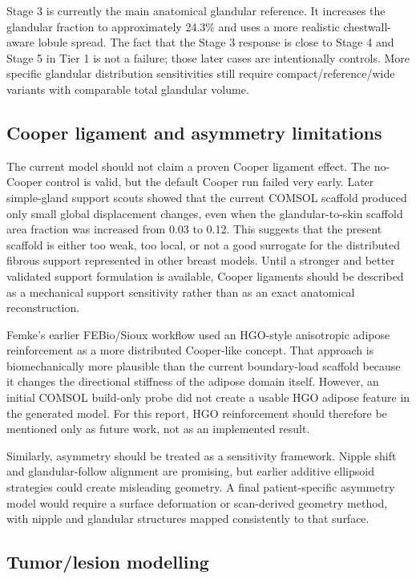 Stage 3 is currently the main anatomical glandular reference. It increases the glandular fraction to approximately 24.3\% and uses a more realistic chestwall-aware lobule spread. The fact that the Stage 3 response is close to Stage 4 and Stage 5 in Tier 1 is not a failure; those later cases are intentionally controls. More specific glandular distribution sensitivities still require compact/reference/wide variants with comparable total glandular volume.

\subsection{Cooper ligament and asymmetry limitations}

The current model should not claim a proven Cooper ligament effect. The no-Cooper control is valid, but the default Cooper run failed very early. Later simple-gland support scouts showed that the current COMSOL scaffold produced only small global displacement changes, even when the glandular-to-skin scaffold area fraction was increased from 0.03 to 0.12. This suggests that the present scaffold is either too weak, too local, or not a good surrogate for the distributed fibrous support represented in other breast models. Until a stronger and better validated support formulation is available, Cooper ligaments should be described as a mechanical support sensitivity rather than as an exact anatomical reconstruction.

Femke's earlier FEBio/Sioux workflow used an HGO-style anisotropic adipose reinforcement as a more distributed Cooper-like concept. That approach is biomechanically more plausible than the current boundary-load scaffold because it changes the directional stiffness of the adipose domain itself. However, an initial COMSOL build-only probe did not create a usable HGO adipose feature in the generated model. For this report, HGO reinforcement should therefore be mentioned only as future work, not as an implemented result.

Similarly, asymmetry should be treated as a sensitivity framework. Nipple shift and glandular-follow alignment are promising, but earlier additive ellipsoid strategies could create misleading geometry. A final patient-specific asymmetry model would require a surface deformation or scan-derived geometry method, with nipple and glandular structures mapped consistently to that surface.

\subsection{Tumor/lesion modelling}

